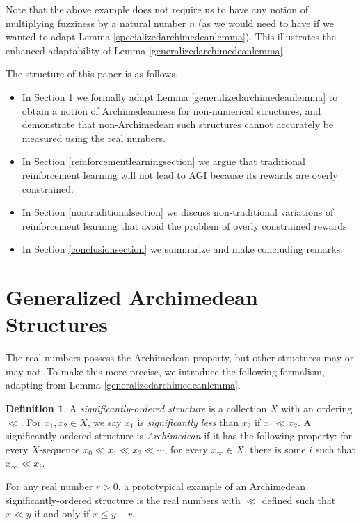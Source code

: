 \documentclass[reqno]{article}
\theoremstyle{definition}
\newtheorem{definition}{Definition}
\begin{document}
Note that the above example does not require us to have any notion
of multiplying fuzziness by a natural number $n$ (as we would need to have
if we wanted to adapt Lemma \ref{specializedarchimedeanlemma}).
This illustrates the enhanced adaptability of Lemma \ref{generalizedarchimedeanlemma}.

The structure of this paper is as follows.
\begin{itemize}
    \item
    In Section \ref{backgroundsection} we formally adapt
    Lemma \ref{generalizedarchimedeanlemma} to obtain a notion of Archimedeanness
    for non-numerical structures, and demonstrate that non-Archimedean such
    structures cannot accurately be measured using the real numbers.
    \item
    In Section \ref{reinforcementlearningsection} we argue that
    traditional reinforcement learning will not lead to AGI because
    its rewards are overly constrained.
    \item
    In Section \ref{nontraditionalsection} we discuss non-traditional
    variations of reinforcement learning that avoid the problem of
    overly constrained rewards.
    \item
    In Section \ref{conclusionsection} we summarize and make concluding remarks.
\end{itemize}


\section{Generalized Archimedean Structures}
\label{backgroundsection}

The real numbers possess the Archimedean property, but other structures
may or may not. To make this more precise,
we introduce the following formalism, adapting from Lemma \ref{generalizedarchimedeanlemma}.

\begin{definition}
    A \emph{significantly-ordered structure} is a collection $X$ with
    an ordering $\ll$.
    For $x_1,x_2\in X$, we say $x_1$ is \emph{significantly less}
    than $x_2$ if $x_1\ll x_2$.
    A significantly-ordered structure is \emph{Archimedean} if it
    has the following property: for every $X$-sequence
    $x_0\ll x_1\ll x_2 \ll \cdots$,
    for every $x_\infty\in X$, there is some $i$ such that $x_\infty\ll x_i$.
\end{definition}

For any real number $r>0$, a prototypical example of an Archimedean
significantly-ordered structure is the real
numbers with $\ll$ defined such that
$x\ll y$ if and only if $x\leq y-r$.
\end{document}
